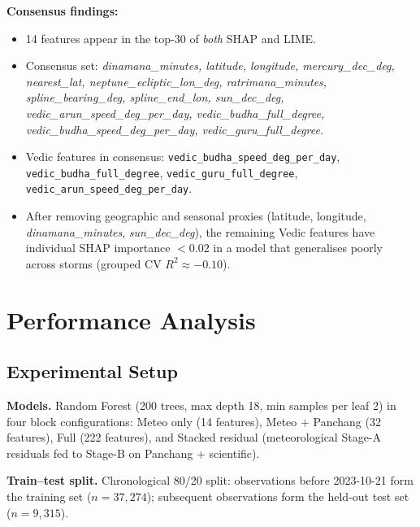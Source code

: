 \documentclass[12pt,a4paper]{article}
\begin{document}
    \textbf{Consensus findings:}
    \begin{itemize}[noitemsep]
    \item 14 features appear in the top-30 of \emph{both} SHAP and LIME.
    \item Consensus set: \textit{dinamana\_minutes, latitude, longitude,
            mercury\_dec\_deg, nearest\_lat, neptune\_ecliptic\_lon\_deg,
            ratrimana\_minutes, spline\_bearing\_deg, spline\_end\_lon,
            sun\_dec\_deg, vedic\_arun\_speed\_deg\_per\_day,
            vedic\_budha\_full\_degree, vedic\_budha\_speed\_deg\_per\_day,
            vedic\_guru\_full\_degree}.
    \item Vedic features in consensus: \texttt{vedic\_budha\_speed\_deg\_per\_day},
            \texttt{vedic\_budha\_full\_degree}, \texttt{vedic\_guru\_full\_degree},
            \texttt{vedic\_arun\_speed\_deg\_per\_day}.
    \item After removing geographic and seasonal proxies (latitude, longitude,
            \textit{dinamana\_minutes}, \textit{sun\_dec\_deg}), the remaining
            Vedic features have individual SHAP importance $< 0.02$ in a model
            that generalises poorly across storms (grouped CV $R^2 \approx -0.10$).
    \end{itemize}

    \section{Performance Analysis}
    \label{sec:performance}

    \subsection{Experimental Setup}

    \textbf{Models.} Random Forest (200 trees, max depth 18, min samples per
    leaf 2) in four block configurations: Meteo only (14 features),
    Meteo + Panchang (32 features), Full (222 features), and Stacked residual
    (meteorological Stage-A residuals fed to Stage-B on Panchang + scientific).

    \textbf{Train--test split.} Chronological 80/20 split: observations before
    2023-10-21 form the training set ($n = 37{,}274$); subsequent observations
    form the held-out test set ($n = 9{,}315$).
\end{document}
